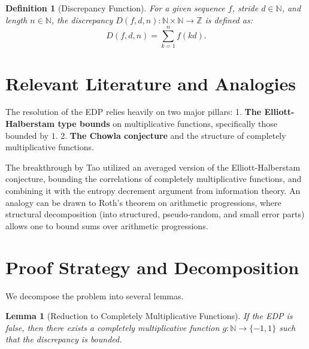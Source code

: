 \documentclass[12pt]{article}
\newtheorem{lemma}[theorem]{Lemma}
\newtheorem{definition}[theorem]{Definition}
\begin{document}
\begin{definition}[Discrepancy Function]
For a given sequence $f$, stride $d \in \mathbb{N}$, and length $n \in \mathbb{N}$, the discrepancy $D(f, d, n) : \mathbb{N} \times \mathbb{N} \to \mathbb{Z}$ is defined as:
\[
D(f, d, n) = \sum_{k=1}^n f(kd).
\]
\end{definition}

\section{Relevant Literature and Analogies}

The resolution of the EDP relies heavily on two major pillars:
1. \textbf{The Elliott-Halberstam type bounds} on multiplicative functions, specifically those bounded by $1$.
2. \textbf{The Chowla conjecture} and the structure of completely multiplicative functions.

The breakthrough by Tao utilized an averaged version of the Elliott-Halberstam conjecture, bounding the correlations of completely multiplicative functions, and combining it with the entropy decrement argument from information theory. An analogy can be drawn to Roth's theorem on arithmetic progressions, where structural decomposition (into structured, pseudo-random, and small error parts) allows one to bound sums over arithmetic progressions.

\section{Proof Strategy and Decomposition}

We decompose the problem into several lemmas.

\begin{lemma}[Reduction to Completely Multiplicative Functions]
If the EDP is false, then there exists a completely multiplicative function $g : \mathbb{N} \to \{-1, 1\}$ such that the discrepancy is bounded.
\end{lemma}
\end{document}
